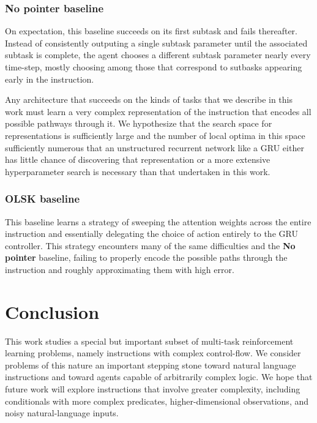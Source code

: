 \documentclass{article}
\begin{document}
\subsubsection{No pointer baseline}
On expectation, this baseline succeeds on its first subtask and fails
thereafter. Instead of consistently outputing a single subtask parameter until
the associated subtask is complete, the agent chooses a different subtask
parameter nearly every time-step, mostly choosing among those that correspond to
sutbasks appearing early in the instruction.

Any architecture that succeeds on the kinds of tasks that we describe in this
work must learn a very complex representation of the instruction that encodes
all possible pathways through it. We hypothesize that the search space for
representations is sufficiently large and the number of local optima in this
space sufficiently numerous that an unstructured recurrent network like a GRU
either has little chance of discovering that representation or a more extensive
hyperparameter search is necessary than that undertaken in this work.

\subsubsection{OLSK baseline}
This baseline learns a strategy of sweeping the attention weights across
the entire instruction and essentially delegating the choice of action entirely
to the GRU controller. This strategy encounters many of the same difficulties
and the \textbf{No pointer} baseline, failing to properly encode the possible
paths through the instruction and roughly approximating them with high error.

\section{Conclusion}
This work studies a special but important subset of multi-task reinforcement
learning problems, namely instructions with complex control-flow. We consider
problems of this nature an important stepping stone toward natural language
instructions and toward agents capable of arbitrarily complex logic. We hope
that future work will explore instructions that involve greater complexity,
including conditionals with more complex predicates, higher-dimensional
observations, and noisy natural-language inputs.

\end{document}
